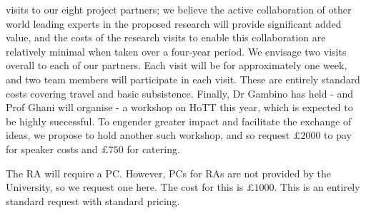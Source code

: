 \documentclass[a4paper,11pt]{article}
\begin{document}
visits to our eight project partners; we believe the active
collaboration of other world leading experts in the proposed research
will provide significant added value, and the costs of the research
visits to enable this collaboration are relatively minimal when taken
over a four-year period. We envisage two visits overall to each of our
partners. Each visit will be for approximately one week, and two team
members will participate in each visit.
These are entirely standard costs covering travel and basic
subsistence. Finally, Dr Gambino has held - and Prof Ghani will organise - a workshop on HoTT
this year, which is expected to be highly successful. To engender greater impact and
facilitate the exchange of ideas, we propose to hold another such
workshop, and so request $\pounds 2000$ to pay for speaker costs and
$\pounds 750$ for catering.

\vspace{0.02in}

 The RA will require a PC. However, PCs
for RAs are not provided by the University, so we request one
here. The cost for this is $\pounds 1000$. This is an entirely
standard request with standard pricing.
\end{document}
